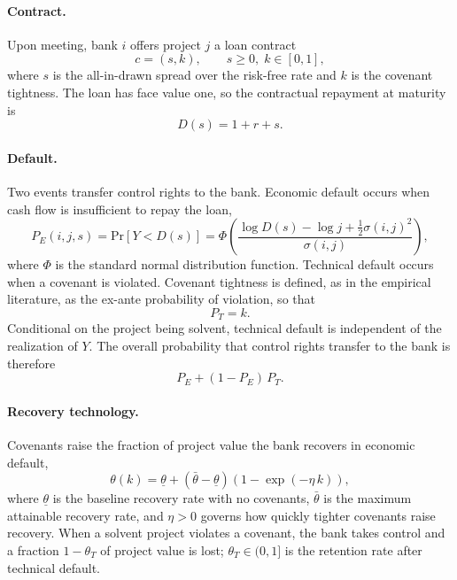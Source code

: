 \documentclass[12pt]{article}
\newcommand{\Prob}{\mathrm{Pr}}
\begin{document}
\paragraph{Contract.}
Upon meeting, bank $i$ offers project $j$ a loan contract
\begin{equation}
  c = (s, k), \qquad s \ge 0,\; k \in [0,1],
  \label{eq:contract}
\end{equation}
where $s$ is the all-in-drawn spread over the risk-free rate and $k$ is the
covenant tightness. The loan has face value one, so the contractual repayment
at maturity is
\begin{equation}
  D(s) = 1 + r + s.
  \label{eq:repayment}
\end{equation}

\paragraph{Default.}
Two events transfer control rights to the bank. Economic default occurs when
cash flow is insufficient to repay the loan,
\begin{equation}
  P_E(i,j,s) = \Prob\!\left[Y < D(s)\right]
  = \Phi\!\left(\frac{\log D(s) - \log j + \tfrac{1}{2}\sigma(i,j)^2}{\sigma(i,j)}\right),
  \label{eq:PE}
\end{equation}
where $\Phi$ is the standard normal distribution function. Technical default
occurs when a covenant is violated. Covenant tightness is defined, as in the
empirical literature, as the ex-ante probability of violation, so that
\begin{equation}
  P_T = k .
  \label{eq:PT}
\end{equation}
Conditional on the project being solvent, technical default is independent of
the realization of $Y$. The overall probability that control rights transfer
to the bank is therefore
\begin{equation}
  P_E + (1 - P_E)\, P_T .
  \label{eq:control}
\end{equation}

\paragraph{Recovery technology.}
Covenants raise the fraction of project value the bank recovers in economic
default,
\begin{equation}
  \theta(k) = \underline{\theta} + \left(\bar{\theta} - \underline{\theta}\right)
  \left(1 - \exp(-\eta\, k)\right),
  \label{eq:theta}
\end{equation}
where $\underline{\theta}$ is the baseline recovery rate with no covenants,
$\bar{\theta}$ is the maximum attainable recovery rate, and $\eta > 0$
governs how quickly tighter covenants raise recovery. When a solvent project
violates a covenant, the bank takes control and a fraction $1 - \theta_T$ of
project value is lost; $\theta_T \in (0,1]$ is the retention rate after
technical default.
\end{document}
